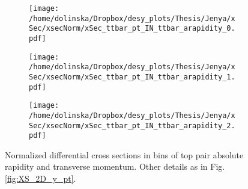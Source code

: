
\begin{figure}[H]
\centering
\begin{subfigure}
  \centering
  \texttt{[image: /home/dolinska/Dropbox/desy\_plots/Thesis/Jenya/xSec/xsecNorm/xSec\_ttbar\_pt\_IN\_ttbar\_arapidity\_0.pdf]}
\end{subfigure}
\begin{subfigure}
  \centering
  \texttt{[image: /home/dolinska/Dropbox/desy\_plots/Thesis/Jenya/xSec/xsecNorm/xSec\_ttbar\_pt\_IN\_ttbar\_arapidity\_1.pdf]}
\end{subfigure}
\begin{subfigure}
  \centering
  \texttt{[image: /home/dolinska/Dropbox/desy\_plots/Thesis/Jenya/xSec/xsecNorm/xSec\_ttbar\_pt\_IN\_ttbar\_arapidity\_2.pdf]}
\end{subfigure}
\caption{Normalized differential cross sections in bins of top pair absolute rapidity and transverse momentum. Other details as in Fig. \ref{fig:XS_2D_y_pt}.}
\label{fig:XS_2D_pttt_ytt}
\end{figure}
